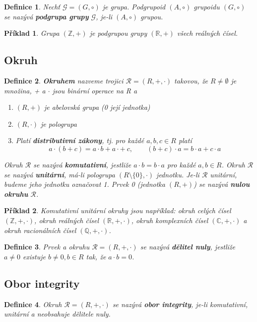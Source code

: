 \documentclass[12pt,a4paper]{article}
\newtheorem{definition}{Definice}
\newtheorem{example}{Příklad}
\begin{document}
\begin{definition}
	Nechť $\mathscr{G} = (G, \circ)$ je grupa. Podgrupoid $(A, \circ)$ grupoidu $(G, \circ)$ se nazývá \textbf{podgrupa grupy} $\mathscr{G}$, je-li $(A, \circ)$ grupou.
\end{definition}

\begin{example}
	Grupa $(\mathbb{Z}, +)$ je podgrupou grupy $(\mathbb{R}, +)$ všech reálných čísel.
\end{example}

\subsection{Okruh}
\begin{definition}
	\textbf{Okruhem} nazveme trojici $\mathscr{R} = (R, + , \cdot)$ takovou, že $R \not= \emptyset$ je množina, + a $\cdot$ jsou binární operace na R a
	\begin{enumerate}
		\item $(R, +)$ je abelovská grupa (0 její jednotka)
		\item $(R, \cdot)$ je pologrupa
		\item Platí \textbf{distributivní zákony}, tj. pro každé $a,b,c \in R$ platí $$a \cdot (b + c) = a \cdot b + a \cdot +\ c, \qquad (b + c) \cdot a = b \cdot a + c \cdot a$$
	\end{enumerate}
	Okruh $\mathscr{R}$ se nazývá \textbf{komutativní}, jestliže $ a \cdot b = b \cdot a$ pro každé $a,b \in R$. Okruh $\mathscr{R}$ se nazývá \textbf{unitární}, má-li pologrupa $(R \setminus \{0\}, \cdot)$ jednotku. Je-li $\mathscr{R}$ unitární, budeme jeho jednotku označovat 1. Prvek 0 (jednotka $(R, +)$) se nazývá \textbf{nulou okruhu} $\mathscr{R}$.
\end{definition}

\begin{example}
	Komutativní unitární okruhy jsou například: okruh celých čísel $(\mathbb{Z}, + , \cdot)$, okruh reálných čísel $(\mathbb{R}, + , \cdot)$, okruh komplexních čísel $(\mathbb{C}, + , \cdot)$ a okruh racionálních čísel $(\mathbb{Q}, + , \cdot)$.
\end{example}

\begin{definition}
	Prvek a okruhu $\mathscr{R} = (R,+,\cdot)$ se nazývá \textbf{dělitel nuly}, jestliže $a \not= 0$ existuje $b \not= 0, b \in R$ tak, že $a \cdot b = 0$.
\end{definition}

\subsection{Obor integrity}
\begin{definition}
	Okruh $\mathscr{R} = (R,+,\cdot)$ se nazývá \textbf{obor integrity}, je-li komutativní, unitární a neobsahuje dělitele nuly.
\end{definition}
\end{document}
